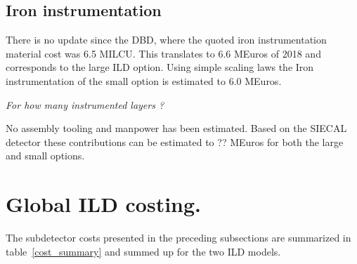 \subsection{Iron instrumentation}
There is no update since the DBD, where the quoted iron instrumentation material cost was 6.5 MILCU. This translates to 6.6 MEuros of 2018 and corresponds to the large ILD option. Using simple scaling laws the Iron instrumentation of the small option is estimated to 6.0 MEuros.

\textit{For how many instrumented layers ?}

No assembly tooling and manpower has been estimated. Based on the SIECAL detector these contributions can be estimated to ?? MEuros for both the large and small options. 

\section{Global ILD costing.}
The subdetector costs presented in the preceding subsections are summarized in table~\ref{cost_summary} and summed up for the two ILD models.
